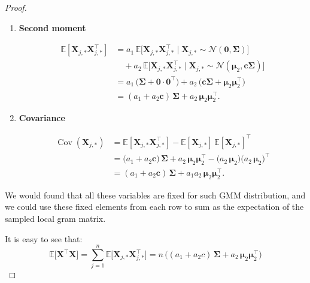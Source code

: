 \documentclass[11pt]{article}
\numberwithin{equation}{section}
\theoremstyle{plain}
\theoremstyle{definition}
\theoremstyle{remark}
\begin{document}
\begin{appendix}
\begin{proof}
\begin{enumerate}
         \item \textbf{Second moment}

         \begin{align*}
         \mathbb E[\mathbf{X}_{j,\ast} \mathbf{X}_{j,\ast}^{\!\top}]
         &= a_{1}\,\mathbb E\bigl[\mathbf{X}_{j,\ast} \mathbf{X}_{j,\ast}^{\!\top}\!\mid\mathbf{X}_{j,\ast}\sim\!\mathcal N(\boldsymbol 0,\mathbf{\Sigma})\bigr]\\[4pt]
         &\quad + a_{2}\,\mathbb E\bigl[\mathbf{X}_{j,\ast} \mathbf{X}_{j,\ast}^{\!\top}\!\mid\mathbf{X}_{j,\ast}\sim\!\mathcal N(\boldsymbol\mu_{2},\boldsymbol c\mathbf{\Sigma})\bigr] \\[4pt]
         &= a_{1}\,\bigl(\mathbf{\Sigma} + \boldsymbol 0\cdot \boldsymbol 0^{\!\top}\bigr)
         + a_{2}\,\bigl(\boldsymbol c\mathbf{\Sigma} + \boldsymbol\mu_{2}\boldsymbol\mu_{2}^{\!\top}\bigr) \\[4pt]
         &= (a_{1}+a_{2}\boldsymbol c)\,\mathbf{\Sigma} + a_{2}\,\boldsymbol\mu_{2}\boldsymbol\mu_{2}^{\!\top}.
         \end{align*}

         \item \textbf{Covariance}

         \begin{align*}
         \operatorname{Cov}(\mathbf{X}_{j,\ast})
         &= \mathbb E[\mathbf{X}_{j,\ast} \mathbf{X}_{j,\ast}^{\!\top}]
         - \mathbb E[\mathbf{X}_{j,\ast}]\,\mathbb E[\mathbf{X}_{j,\ast}]^{\!\top} \\[4pt]
         &=\bigl(a_{1}+a_{2}\boldsymbol c\bigr)\,\mathbf{\Sigma}
         + a_{2}\,\boldsymbol\mu_{2}\boldsymbol\mu_{2}^{\!\top}
         - \bigl(a_{2}\,\boldsymbol\mu_{2}\bigr)\bigl(a_{2}\,\boldsymbol\mu_{2}\bigr)^{\!\top} \\[4pt]
         &= (a_{1}+a_{2}\boldsymbol c)\,\mathbf{\Sigma}
         + a_{1}a_{2}\,\boldsymbol\mu_{2}\boldsymbol\mu_{2}^{\!\top}.
         \end{align*}
         \end{enumerate}

        We would found that all these variables are fixed for such GMM distribution, and we could use these fixed elements from each row to sum as the expectation of the sampled local gram matrix.

          It is easy to see that:
          \[
          \mathbb E\!\bigl[\mathbf{X}^{\top}\mathbf{X}\bigr]
          =\sum_{j=1}^{n}\mathbb E\!\bigl[\mathbf{X}_{j,\ast} \mathbf{X}_{j,\ast}^{\!\top}\bigr]
          = n\,\bigl((a_{1}+a_{2}c)\,\mathbf{\Sigma} + a_{2}\,\boldsymbol{\mu}_{2}\boldsymbol{\mu}_{2}^{\!\top}\bigr)
          \]


\end{proof}
\end{appendix}
\end{document}
